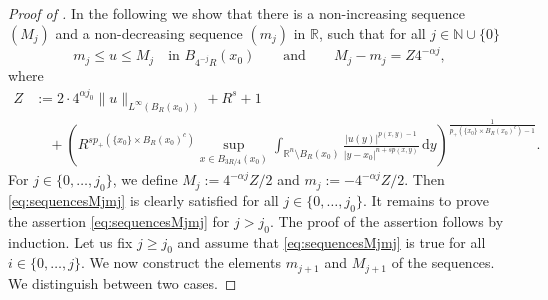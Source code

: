 \documentclass[10pt,a4paper]{amsart}
\newcommand{\N}{\mathbb{N}}
\newcommand{\R}{\mathbb{R}}
\begin{document}
\begin{proof} [Proof of ]
In the following we show that there is a non-increasing sequence $(M_j)$ and a non-decreasing sequence $(m_j)$ in $\R$, such that for all $j\in\N\cup\{0\}$ 
\begin{equation}\label{eq:sequencesMjmj}
m_j \leq u \leq M_j \quad \text{in } B_{4^{-j}R}(x_0) \qquad \text{and} \qquad M_j - m_j = Z4^{-\alpha j},
\end{equation}
where 
\begin{align*}
Z&:= 2\cdot 4^{\alpha j_0} \|u\|_{L^{\infty}(B_R(x_0))} + R^s + 1 \\
& \quad + \left(R^{sp_{+}(\{x_0\}\times B_R(x_0)^c)} \sup_{x \in B_{3R/4}(x_0)} \int_{\mathbb{R}^n \setminus B_R(x_0)} \frac{|u(y)|^{p(x,y)-1}}{|y-x_0|^{n+sp(x,y)}} \,\mathrm{d}y\right)^{\frac{1}{p_{+}(\{x_0\}\times B_R(x_0)^c)-1}} . 
\end{align*}
For $j\in \{0,\dots,j_0\}$, we define $M_j:=4^{-\alpha j} Z/2$ and $m_j:=-4^{-\alpha j} Z/2$. Then \eqref{eq:sequencesMjmj} is clearly satisfied for all $j\in \{0,\dots,j_0\}$. It remains to prove the assertion \eqref{eq:sequencesMjmj} for $j > j_0$. 
The proof of the assertion follows by induction. Let us fix $j\geq j_0$ and assume that \eqref{eq:sequencesMjmj} is true for all $i\in \{0,\dots,j\}$. We now construct the elements $m_{j+1}$ and $M_{j+1}$ of the sequences. We distinguish between two cases.  


\end{proof}
\end{document}
